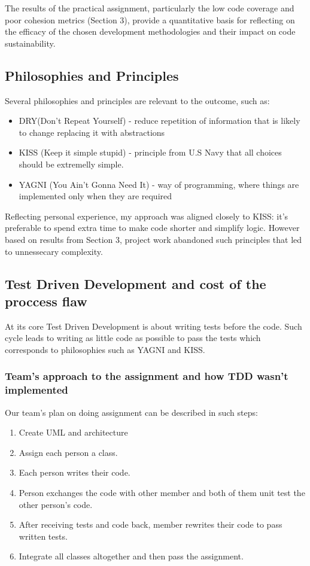 \documentclass{article}
\begin{document}
The results of the practical assignment, particularly the low code coverage and
poor cohesion metrics (Section 3), provide a quantitative basis for reflecting on
the efficacy of the chosen development methodologies and their impact on code
sustainability.

\subsection{Philosophies and Principles}
Several philosophies and principles are relevant to the outcome, such as:

\begin{itemize}
    \item DRY(Don't Repeat Yourself) - reduce repetition of information that is likely to change replacing it with abstractions %
    \item KISS (Keep it simple stupid) - principle from U.S Navy that all choices should be extremelly simple.
    \item YAGNI (You Ain't Gonna Need It) - way of programming, where things are implemented only when they are required %
\end{itemize}
Reflecting personal experience, my approach was aligned closely to KISS: it's preferable to spend extra time to make code shorter and simplify logic. However based on results from Section 3, project work abandoned such principles that led to unnessecary complexity.


\subsection{Test Driven Development and cost of the proccess flaw}
At its core Test Driven Development is about writing tests before the code. Such cycle leads to writing as little code as possible to pass the tests which corresponds to philosophies such as YAGNI and KISS.

\subsubsection{Team's approach to the assignment and how TDD wasn't implemented}
Our team's plan on doing assignment can be described in such steps:
\begin{enumerate}
    \item Create UML and architecture
    \item Assign each person a class.
    \item Each person writes their code.
    \item Person exchanges the code with other member and both of them unit test the other person's code.
    \item After receiving tests and code back, member rewrites their code to pass written tests.
    \item Integrate all classes altogether and then pass the assignment.
\end{enumerate}
\end{document}
